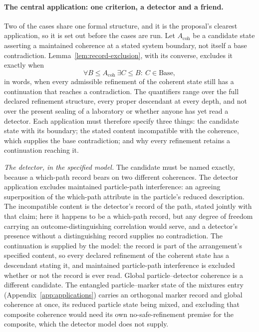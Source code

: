 \paragraph{The central application: one criterion, a detector and a friend.} Two of the cases share one formal structure, and it is the proposal's clearest application, so it is set out before the cases are run. Let $A_{\mathrm{coh}}$ be a candidate state asserting a maintained coherence at a stated system boundary, not itself a base contradiction. Lemma~\ref{lem:record-exclusion}, with its converse, excludes it exactly when
\[
\forall B \le A_{\mathrm{coh}}\ \exists C \le B:\ C \in \mathrm{Base},
\]
in words, when every admissible refinement of the coherent state still has a continuation that reaches a contradiction. The quantifiers range over the full declared refinement structure, every proper descendant at every depth, and not over the present sealing of a laboratory or whether anyone has yet read a detector. Each application must therefore specify three things: the candidate state with its boundary; the stated content incompatible with the coherence, which supplies the base contradiction; and why every refinement retains a continuation reaching it.

\emph{The detector, in the specified model.} The candidate must be named exactly, because a which-path record bears on two different coherences. The detector application excludes maintained particle-path interference: an agreeing superposition of the which-path attribute in the particle's reduced description. The incompatible content is the detector's record of the path, stated jointly with that claim; here it happens to be a which-path record, but any degree of freedom carrying an outcome-distinguishing correlation would serve, and a detector's presence without a distinguishing record supplies no contradiction. The continuation is supplied by the model: the record is part of the arrangement's specified content, so every declared refinement of the coherent state has a descendant stating it, and maintained particle-path interference is excluded whether or not the record is ever read. Global particle--detector coherence is a different candidate. The entangled particle--marker state of the mixtures entry (Appendix~\ref{app:applications}) carries an orthogonal marker record and global coherence at once, its reduced particle state being mixed, and excluding that composite coherence would need its own no-safe-refinement premise for the composite, which the detector model does not supply.

